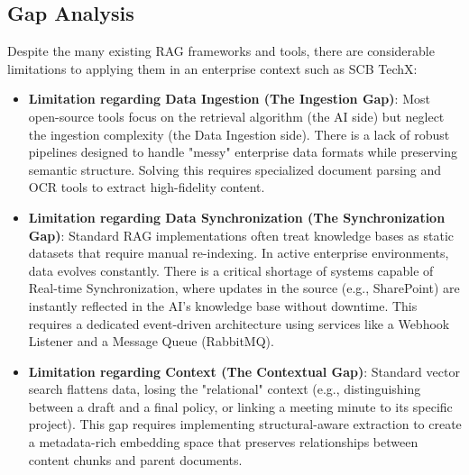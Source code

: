 \documentclass[12pt]{article}
\begin{document}
\subsection{Gap Analysis}
Despite the many existing RAG frameworks and tools, there are considerable limitations to applying them in an enterprise context such as SCB TechX:
\begin{itemize}
    \item \textbf{Limitation regarding Data Ingestion (The Ingestion Gap)}: Most open-source tools focus on the retrieval algorithm (the AI side) but neglect the ingestion complexity (the Data Ingestion side). There is a lack of robust pipelines designed to handle "messy" enterprise data formats while preserving semantic structure. Solving this requires specialized document parsing and OCR tools to extract high-fidelity content.
    \item \textbf{Limitation regarding Data Synchronization (The Synchronization Gap)}: Standard RAG implementations often treat knowledge bases as static datasets that require manual re-indexing. In active enterprise environments, data evolves constantly. There is a critical shortage of systems capable of Real-time Synchronization, where updates in the source (e.g., SharePoint) are instantly reflected in the AI's knowledge base without downtime. This requires a dedicated event-driven architecture using services like a Webhook Listener and a Message Queue (RabbitMQ).
    \item \textbf{Limitation regarding Context (The Contextual Gap)}: Standard vector search flattens data, losing the "relational" context (e.g., distinguishing between a draft and a final policy, or linking a meeting minute to its specific project). This gap requires implementing structural-aware extraction to create a metadata-rich embedding space that preserves relationships between content chunks and parent documents.
\end{itemize}
\end{document}
